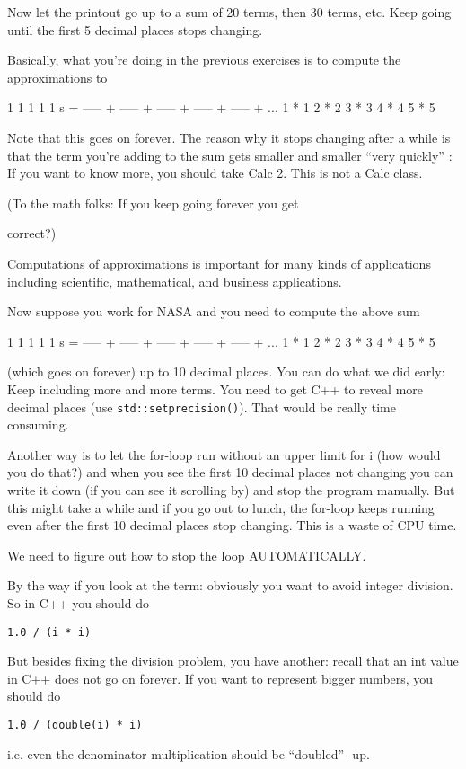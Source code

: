 Now let the printout go up to a sum of 20 terms, then 30 terms, etc.
Keep going until the first 5 decimal places stops changing.

Basically, what you're doing in the previous exercises
is to compute the approximations to
\begin{console}
      1       1       1       1       1
s = ----- + ----- + ----- + ----- + ----- + ...
    1 * 1   2 * 2   3 * 3   4 * 4   5 * 5
\end{console}
Note that this goes on forever. The reason why it stops changing after a
while is that the term you're adding to the sum gets
smaller and smaller ``very quickly'' :
If you want to know more, you should take Calc 2. This is not a Calc
class.

(To the math folks: If you keep going forever you get


correct?)

Computations of approximations is important for many kinds of
applications including scientific, mathematical, and business
applications.

Now suppose you work for NASA and you need to compute the above sum
\begin{console}
      1       1       1       1       1
s = ----- + ----- + ----- + ----- + ----- + ...
    1 * 1   2 * 2   3 * 3   4 * 4   5 * 5
\end{console}
(which goes on forever) up to 10 decimal places. You can do what we did
early: Keep including more and more terms. You need to get C++ to reveal
more decimal places (use \texttt{std::setprecision()}). That would be
really time consuming.

Another way is to let the for-loop run without an upper limit for i (how
would you do that?) and when you see the first 10 decimal places not
changing you can write it down (if you can see it scrolling by) and stop
the program manually. But this might take a while and if you go out to
lunch, the for-loop keeps running even after the first 10 decimal places
stop changing. This is a waste of CPU time.

We need to figure out how to stop the loop AUTOMATICALLY.

By the way if you look at the term:
obviously you want to avoid integer division. So in C++ you should do
\begin{center}
    \texttt{1.0 / (i * i)}
\end{center}
But besides fixing the division problem, you have another: recall that
an int value in C++ does not go on forever. If you want to represent
bigger numbers, you should do
\begin{center}
    \texttt{1.0 / (double(i) * i)}
\end{center}
i.e. even the denominator multiplication should be ``doubled'' -up.

